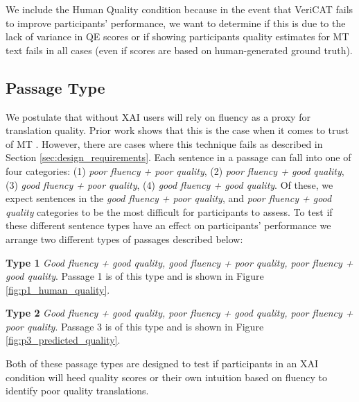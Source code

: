 We include the Human Quality condition because in the event that VeriCAT fails to improve participants' performance, we want to determine if this is due to the lack of variance in QE scores or if showing participants quality estimates for MT text fails in all cases (even if scores are based on human-generated ground truth). 


\subsection{Passage Type}
We postulate that without XAI users will rely on fluency as a proxy for translation quality. Prior work shows that this is the case when it comes to trust of MT \cite{martindaleFluency2018}. However, there are cases where this technique fails as described in Section \ref{sec:design_requirements}.  
Each sentence in a passage can fall into one of four categories: (1) \textit{poor fluency + poor quality}, (2) \textit{poor fluency + good quality}, (3) \textit{good fluency + poor quality}, (4) \textit{good fluency + good quality}. Of these, we expect  sentences in the \textit{good fluency + poor quality}, and \textit{poor fluency + good quality} categories to be the most difficult for participants to assess. To test if these different sentence types have an effect on participants’ performance we arrange two different types of passages described below: 

\begin{compacthang}
    \item \textbf{Type 1} \textit{Good fluency + good quality, good fluency + poor quality, poor fluency + good quality}. Passage 1 is of this type and is shown in Figure \ref{fig:p1_human_quality}.    

    \item \textbf{Type 2} \textit{Good fluency + good quality, poor fluency + good quality, poor fluency + poor quality}. Passage 3 is of this type and is shown in Figure \ref{fig:p3_predicted_quality}.     
\end{compacthang}

Both of these passage types are designed to test if participants in an XAI condition will heed quality scores or their own intuition based on fluency to identify poor quality translations. 


